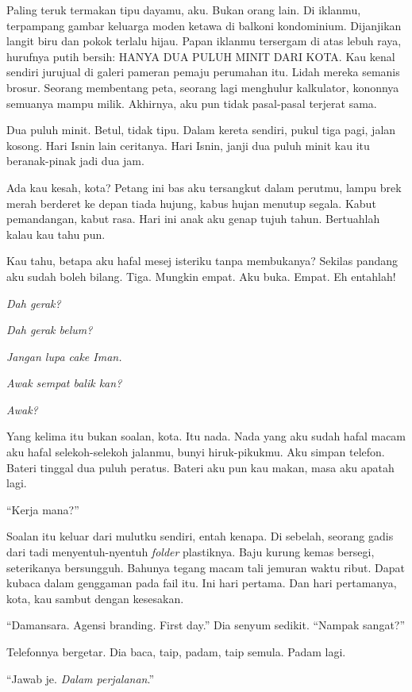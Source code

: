\documentclass[
  11pt,
  a5paper,
  openany,
  oneside]{book}
\begin{document}
Paling teruk termakan tipu dayamu, aku. Bukan orang lain. Di iklanmu,
terpampang gambar keluarga moden ketawa di balkoni kondominium.
Dijanjikan langit biru dan pokok terlalu hijau. Papan iklanmu tersergam
di atas lebuh raya, hurufnya putih bersih: HANYA DUA PULUH MINIT DARI
KOTA. Kau kenal sendiri jurujual di galeri pameran pemaju perumahan itu.
Lidah mereka semanis brosur. Seorang membentang peta, seorang lagi
menghulur kalkulator, kononnya semuanya mampu milik. Akhirnya, aku pun
tidak pasal-pasal terjerat sama.

Dua puluh minit. Betul, tidak tipu. Dalam kereta sendiri, pukul tiga
pagi, jalan kosong. Hari Isnin lain ceritanya. Hari Isnin, janji dua
puluh minit kau itu beranak-pinak jadi dua jam.

Ada kau kesah, kota? Petang ini bas aku tersangkut dalam perutmu, lampu
brek merah berderet ke depan tiada hujung, kabus hujan menutup segala.
Kabut pemandangan, kabut rasa. Hari ini anak aku genap tujuh tahun.
Bertuahlah kalau kau tahu pun.

Kau tahu, betapa aku hafal mesej isteriku tanpa membukanya? Sekilas
pandang aku sudah boleh bilang. Tiga. Mungkin empat. Aku buka. Empat. Eh
entahlah!

\emph{Dah gerak?}

\emph{Dah gerak belum?}

\emph{Jangan lupa cake Iman.}

\emph{Awak sempat balik kan?}

\emph{Awak?}

Yang kelima itu bukan soalan, kota. Itu nada. Nada yang aku sudah hafal
macam aku hafal selekoh-selekoh jalanmu, bunyi hiruk-pikukmu. Aku simpan
telefon. Bateri tinggal dua puluh peratus. Bateri aku pun kau makan,
masa aku apatah lagi.

``Kerja mana?''

Soalan itu keluar dari mulutku sendiri, entah kenapa. Di sebelah,
seorang gadis dari tadi menyentuh-nyentuh \emph{folder} plastiknya. Baju
kurung kemas bersegi, seterikanya bersungguh. Bahunya tegang macam tali
jemuran waktu ribut. Dapat kubaca dalam genggaman pada fail itu. Ini
hari pertama. Dan hari pertamanya, kota, kau sambut dengan kesesakan.

``Damansara. Agensi branding. First day.'' Dia senyum sedikit. ``Nampak
sangat?''

Telefonnya bergetar. Dia baca, taip, padam, taip semula. Padam lagi.

``Jawab je. \emph{Dalam perjalanan}.''
\end{document}
